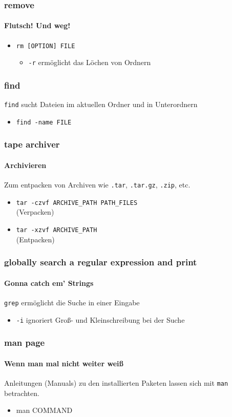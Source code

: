 \documentclass[12pt,utf8]{beamer}
\begin{document}
\begin{frame}
\frametitle{\textcolor{FOSSAGalert}{r}e\textcolor{FOSSAGalert}{m}ove}
\framesubtitle{Flutsch! Und weg!}
\begin{itemize}
	\item \texttt{rm [OPTION] FILE}
	\begin{itemize}[<+->]
		\item \texttt{-r} ermöglicht das Löchen von Ordnern
	\end{itemize}
\end{itemize}
\end{frame}

\begin{frame}
	\frametitle{find}
	\texttt{find} sucht Dateien im aktuellen Ordner und in Unterordnern
	\begin{itemize}
		\item \texttt{find -name FILE}
	\end{itemize}
\end{frame}

\begin{frame}
\frametitle{\textcolor{FOSSAGalert}{t}ape \textcolor{FOSSAGalert}{ar}chiver}
\framesubtitle{Archivieren}
Zum entpacken von Archiven wie \texttt{.tar}, \texttt{.tar.gz}, \texttt{.zip}, etc. 
\begin{itemize}
	\item \texttt{tar -czvf ARCHIVE\_PATH PATH\_FILES}\\(Verpacken)
	\item \texttt{tar -xzvf ARCHIVE\_PATH}\\(Entpacken)
\end{itemize}
\end{frame}

\begin{frame}
\frametitle{\textcolor{FOSSAGalert}{g}lobally search a \textcolor{FOSSAGalert}{r}egular \textcolor{FOSSAGalert}{e}xpression and \textcolor{FOSSAGalert}{p}rint}
\framesubtitle{Gonna catch em' Strings}
\texttt{grep} ermöglicht die Suche in einer Eingabe
\begin{itemize}
	\item \texttt{-i} ignoriert Groß- und Kleinschreibung bei der Suche
\end{itemize}
\end{frame}

\begin{frame}
\frametitle{man page}
\framesubtitle{Wenn man mal nicht weiter weiß}
Anleitungen (Manuals) zu den installierten Paketen lassen sich mit \texttt{man} betrachten.
\begin{itemize}
	\item man COMMAND
\end{itemize}
\end{frame}
\end{document}
